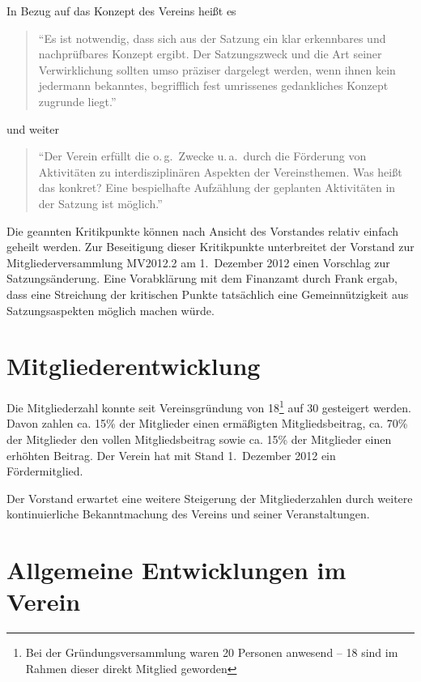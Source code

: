 \documentclass[10pt,DIV16]{scrartcl}
\begin{document}
In Bezug auf das Konzept des Vereins heißt es

\begin{quote}
	"`Es ist notwendig, dass sich aus der Satzung ein klar erkennbares und
	nachprüfbares Konzept ergibt.  Der Satzungszweck und die Art seiner
	Verwirklichung sollten umso präziser dargelegt werden, wenn ihnen kein
	jedermann bekanntes, begrifflich fest umrissenes gedankliches Konzept
	zugrunde liegt."'
\end{quote}

und weiter

\begin{quote}
	"`Der Verein erfüllt die o.\,g.\ Zwecke u.\,a.\ durch \glq die Förderung von
	Aktivitäten zu interdisziplinären Aspekten der Vereinsthemen\grq.  Was heißt
	das konkret?  Eine bespielhafte Aufzählung der geplanten Aktivitäten in
	der Satzung ist möglich."'
\end{quote}

Die geannten Kritikpunkte können nach Ansicht des Vorstandes relativ einfach
geheilt werden. Zur Beseitigung dieser Kritikpunkte unterbreitet der Vorstand
zur Mitgliederversammlung MV2012.2 am 1.~Dezember 2012 einen Vorschlag zur
Satzungsänderung. Eine Vorabklärung mit dem Finanzamt durch Frank ergab, dass
eine Streichung der kritischen Punkte tatsächlich eine Gemeinnützigkeit aus
Satzungsaspekten möglich machen würde.

\section{Mitgliederentwicklung}

Die Mitgliederzahl konnte seit Vereinsgründung von 18\footnote{Bei der
Gründungsversammlung waren 20 Personen anwesend -- 18 sind im Rahmen dieser
direkt Mitglied geworden} auf 30 gesteigert werden.  Davon zahlen ca. 15\% der
Mitglieder einen ermäßigten Mitgliedsbeitrag, ca. 70\% der Mitglieder den
vollen Mitgliedsbeitrag sowie ca. 15\% der Mitglieder einen erhöhten Beitrag.
Der Verein hat mit Stand 1.~Dezember 2012 ein Fördermitglied.

Der Vorstand erwartet eine weitere Steigerung der Mitgliederzahlen durch
weitere kontinuierliche Bekanntmachung des Vereins und seiner
Veranstaltungen.

\section{Allgemeine Entwicklungen im Verein}
\end{document}
